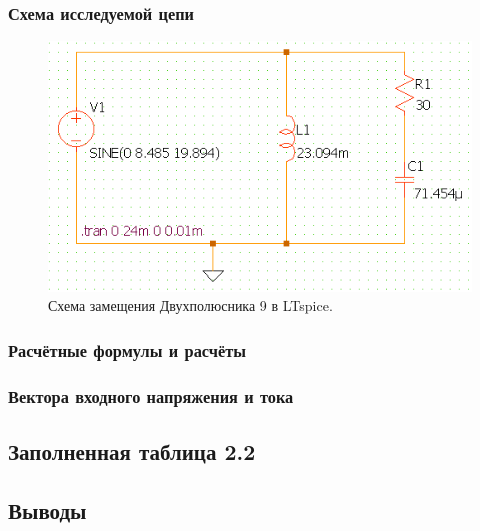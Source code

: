 \subsubsection{Схема исследуемой цепи}
\begin{figure}[H]
	\centering
	\includegraphics[width=1\textwidth]{./data/schema9}
	\caption{Схема замещения Двухполюсника 9 в LTspice.}
\end{figure}
\subsubsection{Расчётные формулы и расчёты}

\subsubsection{Вектора входного напряжения и тока}


\subsection{Заполненная таблица 2.2}

\subsection{Выводы}

